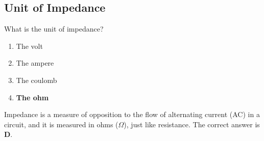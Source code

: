\subsection{Unit of Impedance}
\label{T5C05}

\begin{tcolorbox}[colback=gray!10!white,colframe=black!75!black,title=T5C05]
What is the unit of impedance?
\begin{enumerate}[noitemsep]
    \item The volt
    \item The ampere
    \item The coulomb
    \item \textbf{The ohm}
\end{enumerate}
\end{tcolorbox}

Impedance is a measure of opposition to the flow of alternating current (AC) in a circuit, and it is measured in ohms ($\Omega$), just like resistance. The correct answer is \textbf{D}.